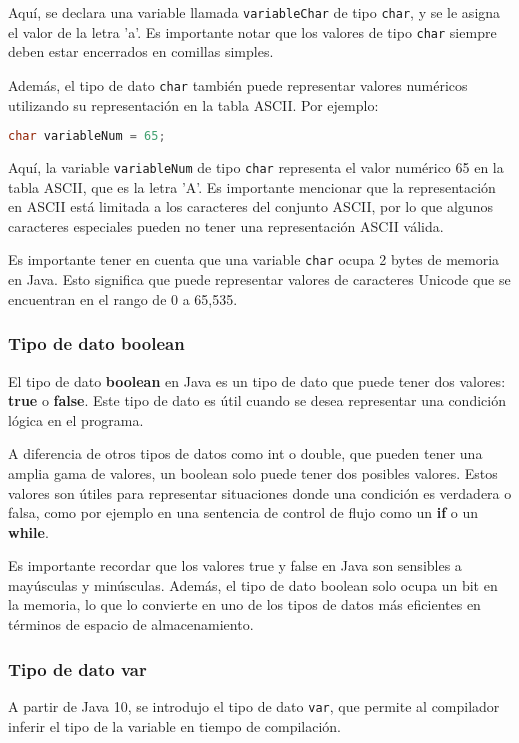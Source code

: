 \documentclass{article}
\begin{document}
Aquí, se declara una variable llamada \lstinline{variableChar} de tipo \lstinline{char}, y se le asigna el valor de la letra 'a'. Es importante notar que los valores de tipo \lstinline{char} siempre deben estar encerrados en comillas simples.

Además, el tipo de dato \lstinline{char} también puede representar valores numéricos utilizando su representación en la tabla ASCII. Por ejemplo:

\begin{lstlisting}[language=Java]
char variableNum = 65;
\end{lstlisting}

Aquí, la variable \lstinline{variableNum} de tipo \lstinline{char} representa el valor numérico 65 en la tabla ASCII, que es la letra 'A'. Es importante mencionar que la representación en ASCII está limitada a los caracteres del conjunto ASCII, por lo que algunos caracteres especiales pueden no tener una representación ASCII válida.

Es importante tener en cuenta que una variable \lstinline{char} ocupa 2 bytes de memoria en Java. Esto significa que puede representar valores de caracteres Unicode que se encuentran en el rango de 0 a 65,535.

\subsubsection*{Tipo de dato boolean}
El tipo de dato \textbf{boolean} en Java es un tipo de dato que puede tener dos valores: \textbf{true} o \textbf{false}. Este tipo de dato es útil cuando se desea representar una condición lógica en el programa.

A diferencia de otros tipos de datos como int o double, que pueden tener una amplia gama de valores, un boolean solo puede tener dos posibles valores. Estos valores son útiles para representar situaciones donde una condición es verdadera o falsa, como por ejemplo en una sentencia de control de flujo como un \textbf{if} o un \textbf{while}.

Es importante recordar que los valores true y false en Java son sensibles a mayúsculas y minúsculas. Además, el tipo de dato boolean solo ocupa un bit en la memoria, lo que lo convierte en uno de los tipos de datos más eficientes en términos de espacio de almacenamiento.

\subsubsection*{Tipo de dato var}
A partir de Java 10, se introdujo el tipo de dato \texttt{var}, que permite al compilador inferir el tipo de la variable en tiempo de compilación.
\end{document}
